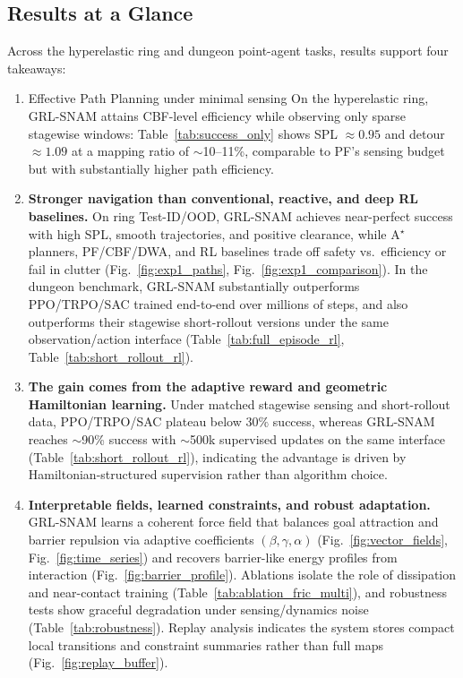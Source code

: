 
\subsection{Results at a Glance}
\label{subsec:results_overview}

Across the hyperelastic ring and dungeon point-agent tasks, results support four takeaways:

\begin{enumerate}
    \item { Effective Path Planning under minimal sensing}
    On the hyperelastic ring, GRL-SNAM attains CBF-level efficiency while observing only sparse stagewise windows: Table~\ref{tab:success_only} shows SPL $\approx 0.95$ and detour $\approx 1.09$ at a mapping ratio of $\sim$10--11\%, comparable to PF's sensing budget but with substantially higher path efficiency.

    \item \textbf{Stronger navigation than {conventional, reactive, and deep RL baselines.}}
    On ring Test-ID/OOD, GRL-SNAM achieves near-perfect success with high SPL, smooth trajectories, and positive clearance, while A$^{\star}$ planners, PF/CBF/DWA, and RL baselines trade off safety vs.\ efficiency or fail in clutter (Fig.~\ref{fig:exp1_paths}, Fig.~\ref{fig:exp1_comparison}). In the dungeon benchmark, GRL-SNAM substantially outperforms PPO/TRPO/SAC trained end-to-end over millions of steps, and also outperforms their stagewise short-rollout versions under the same observation/action interface (Table~\ref{tab:full_episode_rl}, Table~\ref{tab:short_rollout_rl}).

    \item \textbf{The gain comes from the { adaptive reward and geometric Hamiltonian learning.}}
    Under matched stagewise sensing and short-rollout data, PPO/TRPO/SAC plateau below $30\%$ success, whereas GRL-SNAM reaches $\sim$90\% success with $\sim$500k supervised updates on the same interface (Table~\ref{tab:short_rollout_rl}), indicating the advantage is driven by Hamiltonian-structured supervision rather than algorithm choice.

    \item \textbf{Interpretable fields, learned constraints, and robust adaptation.}
    GRL-SNAM learns a coherent force field that balances goal attraction and barrier repulsion via adaptive coefficients $(\beta,\gamma,\alpha)$ (Fig.~\ref{fig:vector_fields}, Fig.~\ref{fig:time_series}) and recovers barrier-like energy profiles from interaction (Fig.~\ref{fig:barrier_profile}). Ablations isolate the role of dissipation and near-contact training (Table~\ref{tab:ablation_fric_multi}), and robustness tests show graceful degradation under sensing/dynamics noise (Table~\ref{tab:robustness}). Replay analysis indicates the system stores compact local transitions and constraint summaries rather than full maps (Fig.~\ref{fig:replay_buffer}).
\end{enumerate}

